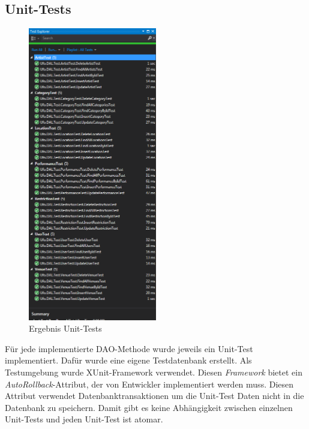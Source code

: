 \documentclass[12pt, a4paper]{article}
\begin{document}
\subsection{Unit-Tests}

\begin{figure}[h] 	
	\centering
		\includegraphics[width=0.5\textwidth]{UnitTests.png}
	\caption{Ergebnis Unit-Tests}
\end{figure}


Für jede implementierte DAO-Methode wurde jeweils ein Unit-Test implementiert. Dafür wurde eine eigene Testdatenbank erstellt. Als Testumgebung wurde XUnit-Framework verwendet. Diesen \textit{Framework} bietet ein \textit{AutoRollback}-Attribut, der von Entwickler implementiert werden muss. Diesen Attribut verwendet Datenbanktransaktionen um die Unit-Test Daten nicht in die Datenbank zu speichern. Damit gibt es keine Abhängigkeit zwischen einzelnen Unit-Tests und jeden Unit-Test ist atomar.

\clearpage


\end{document}
